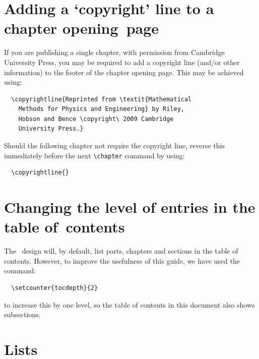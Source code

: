 \section{Adding a `copyright' line to a chapter opening~page}
If you are publishing a single chapter, with permission from Cambridge University Press, you may be required to add a copyright line (and/or other information) to the footer of the chapter opening page. This may be achieved using:
\begin{verbatim}
  \copyrightline{Reprinted from \textit{Mathematical
    Methods for Physics and Engineering} by Riley,
    Hobson and Bence \copyright\ 2009 Cambridge
    University Press.}
\end{verbatim}
Should the following chapter not require the copyright line, reverse this immediately before the next \verb"\chapter" command by using:
\begin{verbatim}
  \copyrightline{}
\end{verbatim}


\section{Changing the level of entries in the table of~contents}
\label{changingentries}
The \cambridge\ design will, by default, list parts, chapters and sections in the table of contents. However, to improve the usefulness of this guide, we have used the command:
\begin{verbatim}
  \setcounter{tocdepth}{2}
\end{verbatim}
to increase this by one level, so the table of contents in this document also shows subsections.


\section{Lists}
\label{lists}

